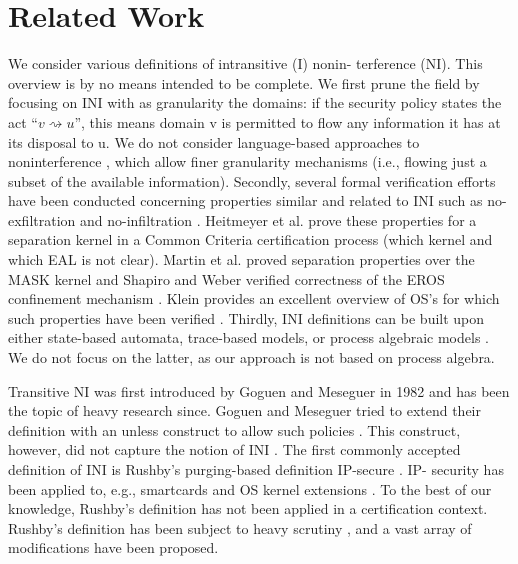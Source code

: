 \documentclass[11pt,a4paper]{article}
\begin{document}
\section{Related Work}
We consider various definitions of intransitive (I) nonin- terference (NI). 
This overview is by no means intended to be complete. We first prune the field 
by focusing on INI with as granularity the domains: if the security policy states 
the act ``$v \rightsquigarrow u$'', this means domain v is permitted to flow any information it has 
at its disposal to u. We do not consider language-based approaches to noninterference
\cite{SKIPaper6}, which allow finer granularity mechanisms (i.e., flowing just a subset of 
the available information). Secondly, several formal verification efforts have 
been conducted concerning properties similar and related to INI such as 
no-exfiltration and no-infiltration \cite{SKIPaper7}. Heitmeyer et al. prove these properties 
for a separation kernel in a Common Criteria certification process \cite{Heitmeyer:2006:FSV:1180405.1180448} 
(which kernel and which EAL is not clear). Martin et al. proved separation 
properties over the MASK kernel \cite{Martin:2000:FCM:786768.786973} and Shapiro and Weber verified correctness 
of the EROS confinement mechanism \cite{Shapiro:2000:VEC:882494.884422}. Klein provides an excellent overview of 
OS's for which such properties have been verified \cite{SKIPaper11}. Thirdly, INI definitions 
can be built upon either state-based automata, trace-based models, or process 
algebraic models \cite{SKIPaper12}. We do not focus on the latter, as our approach is not 
based on process algebra.

Transitive NI was first introduced by Goguen and Meseguer in 1982 \cite{SKIPaper13} and has 
been the topic of heavy research since. Goguen and Meseguer tried to 
extend their definition with an unless construct to allow such policies \cite{SKIPaper14}. 
This construct, however, did not capture the notion of INI \cite{SKIPaper15}. The first 
commonly accepted definition of INI is Rushby's purging-based definition 
IP-secure \cite{rushby92}. IP- security has been applied to, e.g., smartcards \cite{SKIPaper16} and OS 
kernel extensions \cite{SKIPaper17}. To the best of our knowledge, Rushby's definition has 
not been applied in a certification context. Rushby's definition has been 
subject to heavy scrutiny \cite{SKIPaper18}, \cite{VanDerMeyden:2007:IIN:2393847.2393869} and a vast array of modifications have 
been proposed.
\end{document}
